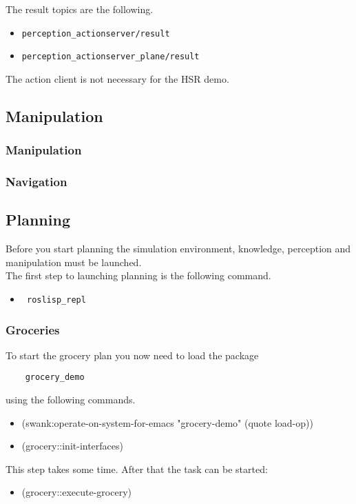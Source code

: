 \documentclass[main.tex]{subfiles}
\begin{document}
The result topics are the following.
\begin{itemize}
\item \begin{verbatim}
perception_actionserver/result
\end{verbatim}
\item \begin{verbatim}
perception_actionserver_plane/result
\end{verbatim}
\end{itemize}

The action client is not necessary for the HSR demo.
	
	\subsection{Manipulation}
	\subsubsection{Manipulation}
	
	\subsubsection{Navigation}
	
	\subsection{Planning}
	Before you start planning the simulation environment, knowledge, perception and manipulation must be launched.\\
	The first step to launching planning is the following command.
	\begin{itemize}
\item \begin{verbatim} roslisp_repl \end{verbatim} 
\end{itemize}
	\subsubsection{Groceries}
	To start the grocery plan you now need to load the package \begin{verbatim}
	grocery_demo
	\end{verbatim} using the following commands.
	\begin{itemize}
\item (swank:operate-on-system-for-emacs "grocery-demo" (quote load-op))
\item (grocery::init-interfaces)
\end{itemize}
This step takes some time. After that the task can be started:
\begin{itemize}
\item (grocery::execute-grocery)
\end{itemize}
\end{document}
